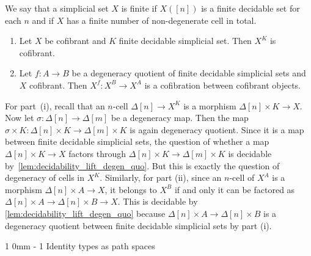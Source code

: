 \documentclass[reqno,10pt,a4paper,oneside,draft]{amsart}
\makeatletter
\renewenvironment{proof}[1][\proofname] {\par\pushQED{\qed}\normalfont\topsep6\p@\@plus6\p@\relax\trivlist\item[\hskip\labelsep\bf#1\@addpunct{.}]\ignorespaces}{\popQED\endtrivlist\@endpefalse}
\renewcommand{\section}{\@startsection
{section}%
{1}%
{0mm}%
{-\baselineskip}%
{1\baselineskip}%
{\Large \bfseries}}%
\numberwithin{equation}{section}
\theoremstyle{mythm}
\theoremstyle{mydef}
\theoremstyle{myrmk}
\newcommand{\co}{\colon}
\makeatother
\begin{document}
We say that a simplicial set $X$ is finite if $X([n])$ is a finite decidable set for each $n$ and if $X$ has a finite number of non-degenerate cell in total.



\begin{lemma} \label{prop:X^kCofibrant}  \hfill 
\begin{enumerate}[$(i)$]
\item Let $X$ be cofibrant and $K$ finite decidable simplicial set. Then $X^K$ is cofibrant.
\item Let $f \co A \rightarrow B$ be a degeneracy quotient of finite decidable simplicial sets and $X$  cofibrant. Then $X^f \co X^B \rightarrow X^A$ is a cofibration between cofibrant objects.
\end{enumerate}
\end{lemma}

\begin{proof}  For part~(i), recall that an $n$-cell $\Delta[n] \rightarrow X^K$ is a morphism $\Delta[n] \times K \rightarrow X$. Now let $\sigma \co \Delta[n] \rightarrow \Delta[m]$ be a degeneracy map. Then the map 
$\sigma \times K \co \Delta[n] \times K \rightarrow \Delta[m] \times K$ is again degeneracy quotient.
Since it is a map between finite decidable simplicial sets, the question of whether a map $\Delta[n] \times K \rightarrow X$ factors through $\Delta[n] \times K \rightarrow \Delta[m] \times K$ is decidable
by~\cref{lem:decidability_lift_degen_quo}. But this is exactly the question of degeneracy of cells in $X^K$.
Similarly, for part (ii), since an $n$-cell of $X^A$ is a morphism $\Delta[n] \times A \rightarrow X$, it belongs to $X^B$ if and only it can be factored as $\Delta[n] \times A \rightarrow \Delta[n] \times B \rightarrow X$. This is decidable by \cref{lem:decidability_lift_degen_quo} because $\Delta[n] \times A \rightarrow \Delta[n] \times B$ is a degeneracy quotient between finite decidable simplicial sets by part (i).
\end{proof} 








\section{Identity types as path spaces}
\label{sec:pats}
\end{document}
